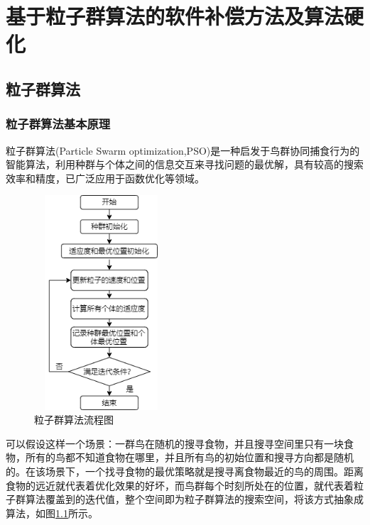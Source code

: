 
\chapter{基于粒子群算法的软件补偿方法及算法硬化}
\section{粒子群算法}
\label{粒子群算法}
\subsection{粒子群算法基本原理}

粒子群算法(Particle Swarm optimization,PSO)是一种启发于鸟群协同捕食行为的智能算法，利用种群与个体之间的信息交互来寻找问题的最优解，具有较高的搜索效率和精度\cite{潘红丽2022基于改进粒子群算法的垃圾清运车辆低碳路径规划}，已广泛应用于函数优化等领域\cite{2022Environmental}。
\begin{figure}[htb]
  \centering
  \includegraphics[width=5cm,height=8cm]{fig/4-fig/粒子群算法流程图.png}
  \caption{粒子群算法流程图}
  \label{fig:粒子群算法流程图}
\end{figure}

可以假设这样一个场景：一群鸟在随机的搜寻食物，并且搜寻空间里只有一块食物，所有的鸟都不知道食物在哪里，并且所有鸟的初始位置和搜寻方向都是随机的。在该场景下，一个找寻食物的最优策略就是搜寻离食物最近的鸟的周围。距离食物的远近就代表着优化效果的好坏，而鸟群每个时刻所处在的位置，就代表着粒子群算法覆盖到的迭代值，整个空间即为粒子群算法的搜索空间，将该方式抽象成算法，如图\ref{fig:粒子群算法流程图}所示。

